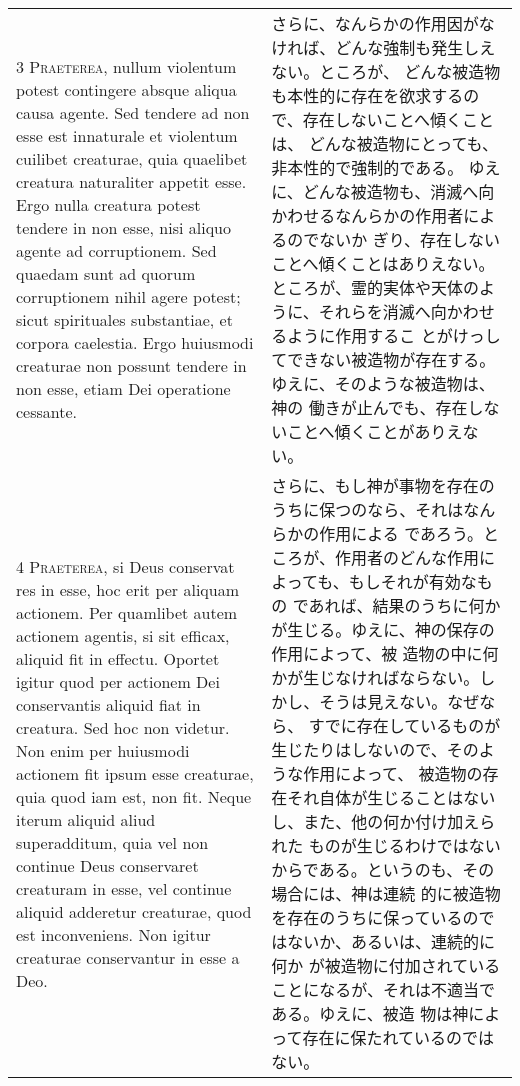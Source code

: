 \documentclass[10pt]{jsarticle} %
\begin{document}
\begin{longtable}{p{21em}p{21em}}
\\


{\scshape 3 Praeterea}, nullum violentum potest
contingere absque aliqua causa agente. Sed tendere ad non esse est
innaturale et violentum cuilibet creaturae, quia quaelibet creatura
naturaliter appetit esse. Ergo nulla creatura potest tendere in non
esse, nisi aliquo agente ad corruptionem. Sed quaedam sunt ad quorum
corruptionem nihil agere potest; sicut spirituales substantiae, et
corpora caelestia. Ergo huiusmodi creaturae non possunt tendere in non
esse, etiam Dei operatione cessante.

&

さらに、なんらかの作用因がなければ、どんな強制も発生しえない。ところが、
 どんな被造物も本性的に存在を欲求するので、存在しないことへ傾くことは、
どんな被造物にとっても、非本性的で強制的である。
ゆえに、どんな被造物も、消滅へ向かわせるなんらかの作用者によるのでないか
 ぎり、存在しないことへ傾くことはありえない。
ところが、霊的実体や天体のように、それらを消滅へ向かわせるように作用するこ
 とがけっしてできない被造物が存在する。ゆえに、そのような被造物は、神の
 働きが止んでも、存在しないことへ傾くことがありえない。

\\


{\scshape 4 Praeterea}, si Deus conservat res in esse,
hoc erit per aliquam actionem. Per quamlibet autem actionem agentis, si
sit efficax, aliquid fit in effectu. Oportet igitur quod per actionem
Dei conservantis aliquid fiat in creatura. Sed hoc non videtur. Non enim
per huiusmodi actionem fit ipsum esse creaturae, quia quod iam est, non
fit. Neque iterum aliquid aliud superadditum, quia vel non continue Deus
conservaret creaturam in esse, vel continue aliquid adderetur creaturae,
quod est inconveniens. Non igitur creaturae conservantur in esse a Deo.

&

さらに、もし神が事物を存在のうちに保つのなら、それはなんらかの作用による
 であろう。ところが、作用者のどんな作用によっても、もしそれが有効なもの
 であれば、結果のうちに何かが生じる。ゆえに、神の保存の作用によって、被
 造物の中に何かが生じなければならない。しかし、そうは見えない。なぜなら、
 すでに存在しているものが生じたりはしないので、そのような作用によって、
 被造物の存在それ自体が生じることはないし、また、他の何か付け加えられた
 ものが生じるわけではないからである。というのも、その場合には、神は連続
 的に被造物を存在のうちに保っているのではないか、あるいは、連続的に何か
 が被造物に付加されていることになるが、それは不適当である。ゆえに、被造
 物は神によって存在に保たれているのではない。


\end{longtable}
\end{document}
